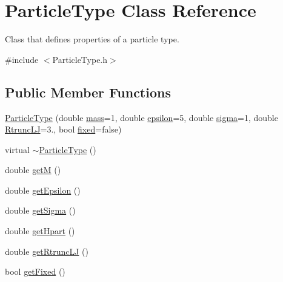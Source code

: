 \hypertarget{classParticleType}{}\section{Particle\+Type Class Reference}
\label{classParticleType}


Class that defines properties of a particle type.  




{\ttfamily \#include $<$Particle\+Type.\+h$>$}

\subsection*{Public Member Functions}
\begin{DoxyCompactItemize}
\item 
\hyperlink{classParticleType_a577516500c098d884c28d8eeec08c327}{Particle\+Type} (double \hyperlink{classParticleType_a50e29ce810f7695975cd1783fc39d123}{mass}=1, double \hyperlink{classParticleType_a7f7401600e63f6445ebc74ca001d7e2f}{epsilon}=5, double \hyperlink{classParticleType_a25ee646610c406b46d8eb12b40c22702}{sigma}=1, double \hyperlink{classParticleType_a5bcb4a735490f24a0c764e7a866ef39f}{Rtrunc\+LJ}=3., bool \hyperlink{classParticleType_acfda1ab133ca64961b06074acff72897}{fixed}=false)
\item 
virtual \hyperlink{classParticleType_a9711b1b94092b1367dae7b449202c45c}{$\sim$\+Particle\+Type} ()
\item 
double \hyperlink{classParticleType_a31c3de0f736ff522d379b26a783f29ed}{getM} ()
\item 
double \hyperlink{classParticleType_acf77231685e5f696dab3574178da32b5}{get\+Epsilon} ()
\item 
double \hyperlink{classParticleType_aa3c33d3be7fc78e46696015db9a51785}{get\+Sigma} ()
\item 
double \hyperlink{classParticleType_a553c0d90d8f94ed7b1b7051769414139}{get\+Hpart} ()
\item 
double \hyperlink{classParticleType_a7cebf1ef4484c2d6110515ec5bdfc034}{get\+Rtrunc\+LJ} ()
\item 
bool \hyperlink{classParticleType_a31a86d425cb43ae9cf49acb9475d0728}{get\+Fixed} ()
\end{DoxyCompactItemize}
